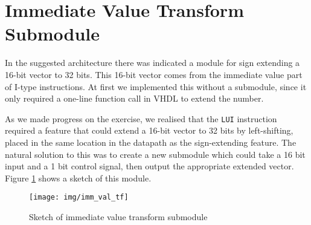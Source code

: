 \section{Immediate Value Transform Submodule}
In the suggested architecture there was indicated a module for sign extending a 16-bit vector to 32 bits.
This 16-bit vector comes from the immediate value part of I-type instructions.
At first we implemented this without a submodule,
since it only required a one-line function call in VHDL to extend the number.


As we made progress on the exercise,
we realised that the \texttt{LUI} instruction required a feature that could extend a 16-bit vector to 32 bits by left-shifting,
placed in the same location in the datapath as the sign-extending feature.
The natural solution to this was to create a new submodule which could take a 16 bit input and a 1 bit control signal, then output the appropriate extended vector.
Figure \ref{fig:imm_val_tf} shows a sketch of this module.

\begin{figure}[p]
    \centering
    \texttt{[image: img/imm\_val\_tf]}
    \caption{Sketch of immediate value transform submodule}
    \label{fig:imm_val_tf}
\end{figure}

